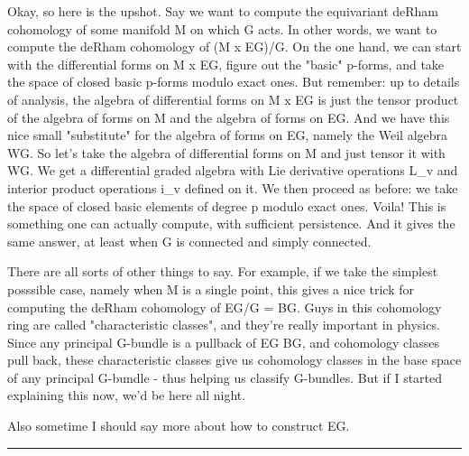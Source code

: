 Okay, so here is the upshot.  Say we want to compute the equivariant
deRham cohomology of some manifold M on which G acts.  In other words,
we want to compute the deRham cohomology of (M x EG)/G.  On the one
hand, we can start with the differential forms on M x EG, figure out the
"basic" p-forms, and take the space of closed basic p-forms
modulo exact ones.  But remember: up to details of analysis, the algebra
of differential forms on M x EG is just the tensor product of the
algebra of forms on M and the algebra of forms on EG.  And we have this
nice small "substitute" for the algebra of forms on EG, namely
the Weil algebra WG.  So let's take the algebra of differential forms on
M and just tensor it with WG.  We get a differential graded algebra with
Lie derivative operations L_{v} and interior product operations 
i_{v}
defined on it.  We then proceed as before: we take the space of closed
basic elements of degree p modulo exact ones.  Voila!  This is something
one can actually compute, with sufficient persistence.  And it gives the
same answer, at least when G is connected and simply connected.

There are all sorts of other things to say.  For example, if we take the
simplest posssible case, namely when M is a single point, this gives a
nice trick for computing the deRham cohomology of EG/G = BG.  Guys in 
this cohomology ring are called "characteristic classes", and they're
really important in physics.  Since any principal G-bundle is a pullback
of EG \to  BG, and cohomology classes pull back, these characteristic
classes give us cohomology classes in the base space of any principal
G-bundle - thus helping us classify G-bundles.  But if I started explaining
this now, we'd be here all night.

Also sometime I should say more about how to construct EG.  



 \par\noindent\rule{\textwidth}{0.4pt}

